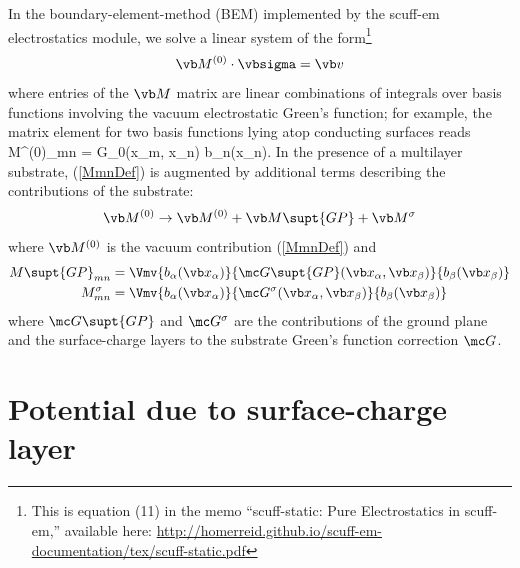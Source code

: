 \documentclass[letterpaper]{article}
\begin{document}
In the boundary-element-method (BEM) implemented by the {\sc scuff-em}
electrostatics module, we solve a linear system of the form\footnote{This
is equation (11) in the memo ``{\sc scuff-static}: Pure Electrostatics 
in {\sc scuff-em},'' available here:
\url{http://homerreid.github.io/scuff-em-documentation/tex/scuff-static.pdf}}
$$ \vb M^{(0)} \cdot \vbsigma = \vb v$$
where entries of the $\vb M$ matrix are linear combinations of
integrals over basis functions involving the vacuum electrostatic
Green's function; for example, the matrix element for two basis functions
lying atop conducting surfaces reads
{
  M^{(0)}_{mn} = 
                     {G_0(\vb x_m, \vb x_n)}
                     {b_n(\vb x_n)}.
}
In the presence of a multilayer substrate, (\ref{MmnDef}) is augmented
by additional terms describing the contributions of the substrate:
$$ \vb M^{(0)} \to \vb M^{(0)} + \vb M\supt{GP} + \vb M^\sigma$$
where $\vb M^{(0)}$ is the vacuum contribution (\ref{MmnDef})
and 
\begin{align*}
  M\supt{GP}_{mn} 
   &= \Vmv{b_\alpha(\vb x_\alpha)}
          {\mc G\supt{GP}(\vb x_\alpha, \vb x_\beta)}
          {b_\beta(\vb x_\beta)}
\\
  M^\sigma_{mn} 
   &= \Vmv{b_\alpha(\vb x_\alpha)}
          {\mc G^\sigma(\vb x_\alpha, \vb x_\beta)}
          {b_\beta(\vb x_\beta)}
\end{align*}
where $\mc G\supt{GP}$ and $\mc G^\sigma$ are the contributions
of the ground plane and the surface-charge layers to 
the substrate Green's function correction $\mc G$.

\appendix
\newpage
\section{Potential due to surface-charge layer}
\label{SurfaceChargeLayerAppendix}
\end{document}

